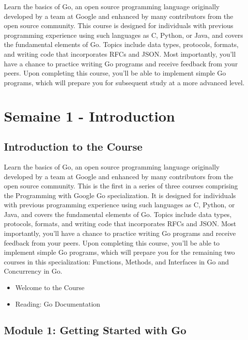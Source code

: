 




Learn the basics of Go, an open source programming language originally developed by a team at Google and enhanced by many contributors from the open source community. This course is designed for individuals with previous programming experience using such languages as C, Python, or Java, and covers the fundamental elements of Go. Topics include data types, protocols, formats, and writing code that incorporates RFCs and JSON. Most importantly, you’ll have a chance to practice writing Go programs and receive feedback from your peers. Upon completing this course, you'll be able to implement simple Go programs, which will prepare you for subsequent study at a more advanced level.

\section*{Semaine 1 - Introduction}

\subsection*{Introduction to the Course}

Learn the basics of Go, an open source programming language originally developed by a team at Google and enhanced by many contributors from the open source community. This is the first in a series of three courses comprising the Programming with Google Go specialization. It is designed for individuals with previous programming experience using such languages as C, Python, or Java, and covers the fundamental elements of Go. Topics include data types, protocols, formats, and writing code that incorporates RFCs and JSON. Most importantly, you’ll have a chance to practice writing Go programs and receive feedback from your peers. Upon completing this course, you’ll be able to implement simple Go programs, which will prepare you for the remaining two courses in this specialization: Functions, Methods, and Interfaces in Go and Concurrency in Go.

\begin{itemize}[label={$\bullet$}]
    \item Welcome to the Course
    \item Reading: Go Documentation
\end{itemize}

\subsection*{Module 1: Getting Started with Go}

